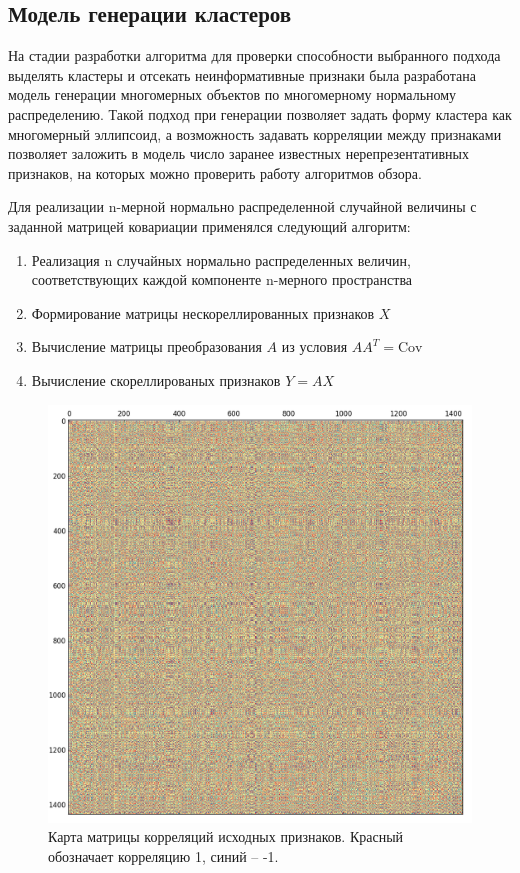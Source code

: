 \subsection{Модель генерации кластеров}
На стадии разработки алгоритма для проверки способности выбранного подхода выделять кластеры и отсекать неинформативные признаки была разработана модель генерации многомерных объектов по многомерному нормальному распределению. Такой подход при генерации позволяет задать форму кластера как многомерный эллипсоид, а возможность задавать корреляции между признаками позволяет заложить в модель число заранее известных нерепрезентативных признаков, на которых можно проверить работу алгоритмов обзора.

Для реализации n-мерной нормально распределенной случайной величины с заданной матрицей ковариации применялся следующий алгоритм:
\begin{enumerate}
  \item Реализация n случайных нормально распределенных величин, соответствующих каждой компоненте n-мерного пространства
  \item Формирование матрицы нескореллированных признаков $X$
  \item Вычисление матрицы преобразования $A$ из условия $AA^T=\text{Cov}$
  \item Вычисление скореллированых признаков $Y=AX$
\end{enumerate}

\begin{figure}[H]
	\center
  \includegraphics[width=0.5\linewidth]{pics/correlations_blob.png}
  \caption{Карта матрицы корреляций исходных признаков. Красный обозначает корреляцию 1, синий -- -1.}
  \label{correlation_blob}
\end{figure}

